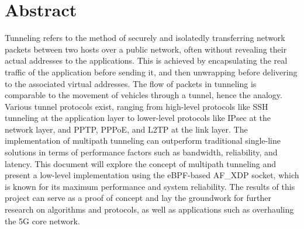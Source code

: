 \chapter*{Abstract}

Tunneling refers to the method of securely and isolatedly transferring network packets between two hosts over a public network, often without revealing their actual addresses to the applications. 
This is achieved by encapsulating the real traffic of the application before sending it, and then unwrapping before delivering to the associated virtual addresses.
The flow of packets in tunneling is comparable to the movement of vehicles through a tunnel, hence the analogy. Various tunnel protocols exist, ranging from high-level protocols like SSH tunneling at the application layer to lower-level protocols like IPsec at the network layer, and PPTP, PPPoE, and L2TP at the link layer.
The implementation of multipath tunneling can outperform traditional single-line solutions in terms of performance factors such as bandwidth, reliability, and latency.
This document will explore the concept of multipath tunneling and present a low-level implementation using the eBPF-based AF\_XDP socket, which is known for its maximum performance and system reliability.
The results of this project can serve as a proof of concept and lay the groundwork for further research on algorithms and protocols, as well as applications such as overhauling the 5G core network.








